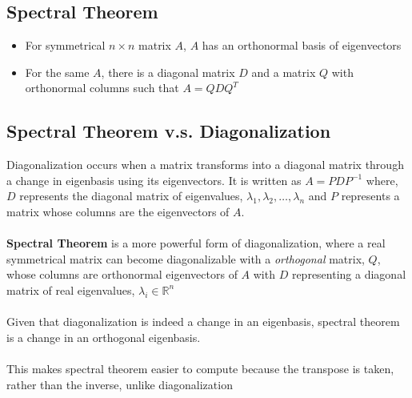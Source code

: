 \begin{enumerate}
\section{Spectral Theorem}
\begin{itemize}
  \item For symmetrical $n \times n$ matrix $A$, $A$ has an orthonormal basis of eigenvectors
  \item For the same $A$, there is a diagonal matrix $D$ and a matrix $Q$   with orthonormal columns such that $A = QDQ^T$ 
\end{itemize}
\subsection{Spectral Theorem v.s. Diagonalization}
Diagonalization occurs when a matrix transforms into a 
diagonal matrix through a change in eigenbasis using its eigenvectors. 
It is written as $A = PDP^{-1}$ where, $D$ represents the diagonal matrix of eigenvalues, $\lambda_1, \lambda_2, \dots, \lambda_n$ and $P$ represents a matrix whose columns are the eigenvectors of $A$. \\\\
\textbf{Spectral Theorem} is a more powerful form of diagonalization, where a real symmetrical matrix can become diagonalizable with a \emph{orthogonal} matrix, $Q$, whose columns are orthonormal eigenvectors of $A$ with $D$ representing a diagonal matrix of real eigenvalues,  
$\lambda_i \in \mathbb{R}^{n}$ \\\\
Given that diagonalization is indeed a change in an eigenbasis, 
spectral theorem is a change in an orthogonal eigenbasis. \\\\
This makes spectral theorem easier to compute because the transpose is taken, rather than the inverse, unlike diagonalization

\end{enumerate}
